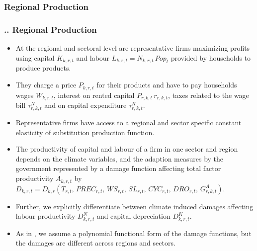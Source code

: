 \documentclass[11pt,aspectratio=169]{beamer}
\begin{document}
\subsubsection{Regional Production}
\begin{frame}
\frametitle{{\thesection.\thesubsection.\thesubsubsection} Regional Production}
\scriptsize
\begin{itemize}
\item At the regional and sectoral level are representative firms maximizing profits using capital $K_{k,r,t}$ and labour $L_{k,r,t} = N_{k,r,t} \, Pop_{t}$ provided by households to produce products. 
\item They charge a price $P_{k,r,t}$ for their products and have to pay households wages $W_{k,r,t}$, interest on rented capital $P_{r,k,t} \, r_{r,k,t}$, taxes related to the wage bill $\tau^{N}_{r,k,t}$ and on capital expenditure $\tau^{K}_{r,k,t}$.
\item Representative firms have access to a regional and sector specific constant elasticity of substitution production function.
\item The productivity of capital and labour of a firm in one sector and region depends on the climate variables, and the adaption measures by the government represented by a damage function affecting total factor productivity $A_{k,r,t}$ by $D_{k,r,t} = D_{k,r}\left(T_{r,t}, \, PREC_{r,t}, \, WS_{r,t}, \, SL_{r,t}, \, CYC_{r,t}, \, DRO_{r,t}, \, G^{A}_{r,k,t} \right)$.
\item Further, we explicitly differentiate between climate induced damages affecting labour productivity $D_{k,r,t}^N$ and capital depreciation $D_{k,r,t}^K$. 
\item As in \cite{nordhaus1993optimal}, we assume a polynomial functional form of the damage functions, but the damages are different across regions and sectors.
\end{itemize}
\end{frame}
\end{document}
